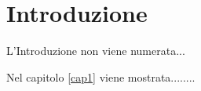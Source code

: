 
\chapter*{Introduzione}


L'Introduzione non viene numerata...

Nel capitolo \ref{cap1} viene mostrata........


